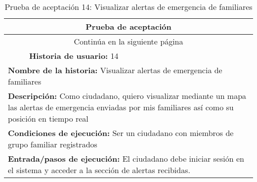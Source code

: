 \begin{longtable}{|p{6.7cm}|p{6.7cm}|}
    \caption{Prueba de aceptación 14: Visualizar alertas de emergencia de familiares} \label{tab:prueba-14}                                                                                                                                                                                    \\
    \hline
    \multicolumn{2}{|c|}{\textbf{Prueba de aceptación}}                                                                                                                                                                                                                                        \\
    \hline
    \endfirsthead
    \hline
    \endhead
    \hline
    \multicolumn{2}{|c|}{{Continúa en la siguiente página}}                                                                                                                                                                                                                                    \\
    \hline
    \endfoot
    \hline
    \endlastfoot
    \multicolumn{1}{|p{6.7cm}|}{\textbf{Número} 14} & \multicolumn{1}{|p{6.7cm}|}{\textbf{Historia de usuario:} 14}                                                                                                                                                                            \\
    \hline
    \multicolumn{2}{|p{13.4cm}|}{\textbf{Nombre de la historia:} Visualizar alertas de emergencia de familiares}                                                                                                                                                                               \\
    \hline
    \multicolumn{2}{|p{13.4cm}|}{\textbf{Descripción:} Como ciudadano, quiero visualizar mediante un mapa las alertas de emergencia enviadas por mis familiares así como su posición en tiempo real}                                                                                           \\
    \hline
    \multicolumn{2}{|p{13.4cm}|}{\textbf{Condiciones de ejecución:} Ser un ciudadano con miembros de grupo familiar registrados}                                                                                                                                                               \\
    \hline
    \multicolumn{2}{|p{13.4cm}|}{\textbf{Entrada/pasos de ejecución:} El ciudadano debe iniciar sesión en el sistema y acceder a la sección de alertas recibidas.}                                                                                                                             \\

\end{longtable}
